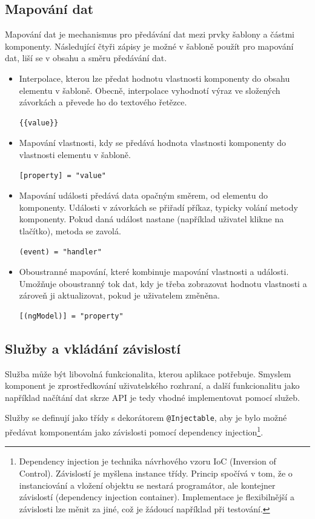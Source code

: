 \documentclass[
  digital, %
  oneside, %
  table,   %
  nolof,     %
  nolot,     %
]{fithesis3}
\begin{document}
\subsection{Mapování dat}
Mapování dat je mechanismus pro předávání dat mezi prvky šablony a částmi komponenty. Následující čtyři zápisy je možné v šabloně použít pro mapování dat, liší se v obsahu a směru předávání dat.  \cite{angulario}
\begin{itemize}
  \item Interpolace, kterou lze předat hodnotu vlastnosti komponenty do obsahu elementu v šabloně. Obecně, interpolace vyhodnotí výraz ve složených závorkách a převede ho do textového řetězce.
\begin{lstlisting}[showstringspaces=false]
{{value}}
\end{lstlisting}
  \item Mapování vlastnosti, kdy se předává hodnota vlastnosti komponenty do vlastnosti elementu v šabloně.
  \begin{lstlisting}[showstringspaces=false]
[property] = "value"
\end{lstlisting}
  \item Mapování události předává data opačným směrem, od elementu do komponenty. Události v závorkách se přiřadí příkaz, typicky volání metody komponenty. Pokud daná událost nastane (například uživatel klikne na tlačítko), metoda se zavolá.
\begin{lstlisting}[showstringspaces=false]
(event) = "handler"
\end{lstlisting}
  \item Oboustranné mapování, které kombinuje mapování vlastnosti a události. Umožňuje oboustranný tok dat, kdy je třeba zobrazovat hodnotu vlastnosti a zároveň ji aktualizovat, pokud je uživatelem změněna.
\begin{lstlisting}[showstringspaces=false]
[(ngModel)] = "property"
\end{lstlisting}
\end{itemize}

\subsection{Služby a vkládání závislostí}
Služba může být libovolná funkcionalita, kterou aplikace potřebuje. Smyslem komponent je zprostředkování uživatelského rozhraní, a další funkcionalitu jako například načítání dat skrze API je tedy vhodné implementovat pomocí služeb.  \cite{angulario}\par
Služby se definují jako třídy s dekorátorem \verb|@Injectable|, aby je bylo možné předávat komponentám jako závislosti pomocí dependency injection\footnote{Dependency injection je technika návrhového vzoru IoC (Inversion of Control). Závislostí je myšlena instance třídy. Princip spočívá v tom, že o instanciování a vložení objektu se nestará programátor, ale kontejner závislostí (dependency injection container). Implementace je flexibilnější a závislosti lze měnit za jiné, což je žádoucí například při testování.}.
\end{document}
